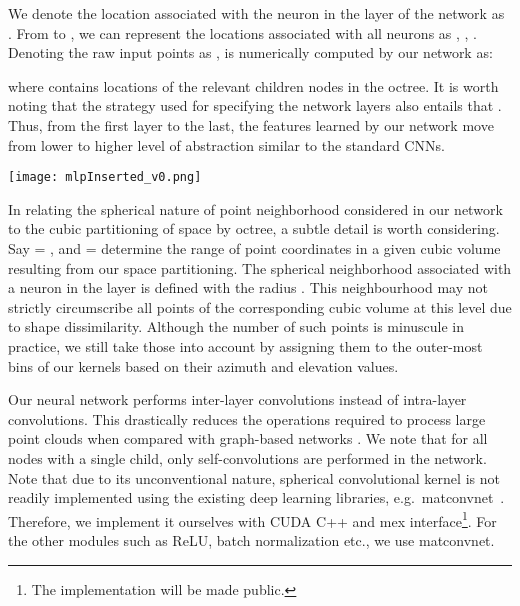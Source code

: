 \documentclass[10pt,twocolumn,letterpaper]{article}
\begin{document}
We denote the location associated with the  neuron in the  layer of the network as . From  to , we can  represent the locations associated with all neurons as , , . Denoting the raw input points as ,  is numerically computed by our network   as:
\vspace{-3mm}

  where  contains  locations of the relevant children nodes in the octree.  It is worth noting that the strategy used  for specifying the network layers also entails that .  Thus, from the first layer to the last, the features learned by our network move from lower to higher level of abstraction similar to the standard CNNs.

\begin{figure*}[t]
  \centering
  \texttt{[image: mlpInserted\_v0.png]}
  \caption{Classification and segmentation using the core network of Fig.~\ref{fig:network}. For classification, the features at the root node (top layer) are concatenated with the max-pooled (dashed lines) features at the remaining layers followed by FC layers. For segmentation, the representation of a point uses the layer-level features of all the ancestors along the path to the root node, e.g.~red path for point `1' and blue path for point `'.  Point-wise classification (segmentation) is performed using the concatenated raw point features (), the MLP features and all the extracted layer-level features. A simple configuration MLP(32)-Octree(64-128-256) is shown for illustration.}
\label{fig:segNet}
  \vspace{-3mm}
\end{figure*}


In relating the spherical nature of point  neighborhood  considered in our network to  the cubic partitioning of  space by octree, a subtle detail is worth considering.
Say  = , and  =   determine the range of point coordinates in a given cubic volume resulting from our space partitioning.  The spherical neighborhood associated  with a  neuron in the  layer is defined with  the radius .  This neighbourhood may not strictly circumscribe all points of the corresponding cubic volume at this level due to shape dissimilarity. Although  the number of such points is minuscule in practice,  we still take those  into account by assigning them to the outer-most bins of our kernels based on their azimuth and elevation values.


Our neural network performs inter-layer convolutions instead of intra-layer convolutions. This drastically reduces the operations required to process large point clouds when compared with graph-based networks  \cite{bruna2013spectral,defferrard2016convolutional,kipf2017semi,simonovsky2017dynamic,yi2017syncspeccnn}. We note that for all nodes with a single child, only self-convolutions are performed in the network. Note that due to its unconventional nature, spherical convolutional kernel  is not readily implemented using the existing deep learning libraries, e.g.~matconvnet~\cite{vedaldi2015matconvnet}. Therefore, we implement it ourselves with CUDA C++ and mex interface\footnote{The implementation will be made public.}. For the other modules such as ReLU, batch normalization etc., we use matconvnet.
\end{document}
